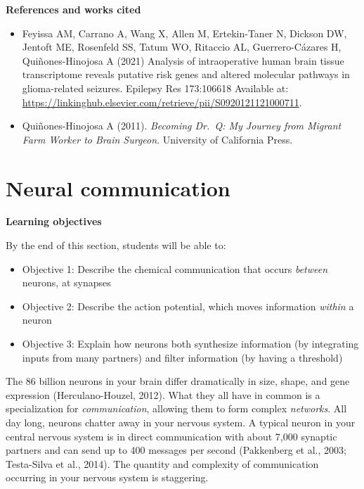 \documentclass[
]{book}
\begin{document}
\textbf{References and works cited}

\begin{itemize}
\item
  Feyissa AM, Carrano A, Wang X, Allen M, Ertekin-Taner N, Dickson DW, Jentoft ME, Rosenfeld SS, Tatum WO, Ritaccio AL, Guerrero-Cázares H, Quiñones-Hinojosa A (2021) Analysis of intraoperative human brain tissue transcriptome reveals putative risk genes and altered molecular pathways in glioma-related seizures. Epilepsy Res 173:106618 Available at: \url{https://linkinghub.elsevier.com/retrieve/pii/S0920121121000711}.
\item
  Quiñones-Hinojosa A (2011). \emph{Becoming Dr.~Q: My Journey from Migrant Farm Worker to Brain Surgeon}. University of California Press.
\end{itemize}

\hypertarget{neurophysiology-communication}{%
\section{Neural communication}\label{neurophysiology-communication}}

\textbf{Learning objectives}

By the end of this section, students will be able to:

\begin{itemize}
\item
  Objective 1: Describe the chemical communication that occurs \emph{between} neurons, at synapses
\item
  Objective 2: Describe the action potential, which moves information \emph{within} a neuron
\item
  Objective 3: Explain how neurons both synthesize information (by integrating inputs from many partners) and filter information (by having a threshold)
\end{itemize}

The 86 billion neurons in your brain differ dramatically in size, shape, and gene expression (Herculano-Houzel, 2012). What they all have in common is a specialization for \emph{communication}, allowing them to form complex \emph{networks}. All day long, neurons chatter away in your nervous system. A typical neuron in your central nervous system is in direct communication with about 7,000 synaptic partners and can send up to 400 messages per second (Pakkenberg et al., 2003; Testa-Silva et al., 2014). The quantity and complexity of communication occurring in your nervous system is staggering.
\end{document}
